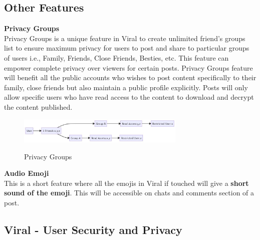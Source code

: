 \documentclass[conference]{IEEEtran}
\begin{document}
\subsection{\textbf{Other Features}}

\textbf{Privacy Groups}\\

Privacy Groups is a unique feature in Viral to create unlimited friend's groups list to ensure maximum privacy for users to post and share to particular groups of users i.e., Family, Friends, Close Friends, Besties, etc. This feature can empower complete privacy over viewers for certain posts. Privacy Groups feature will benefit all the public accounts who wishes to post content specifically to their family, close friends but also maintain a public profile explicitly. Posts will only allow specific users who have read access to the content to download and decrypt the content published.  \\

\begin{figure}[H]
\includegraphics[width=8cm]{privacygroups}\\
\caption{Privacy Groups}
\end{figure}

\textbf{Audio Emoji}\\

This is a short feature where all the emojis in Viral if touched will give a \textbf{short sound of the emoji}. This will be accessible on chats and comments section of a post.\\

\subsection{\textbf{Viral - User Security and Privacy}}
\end{document}
